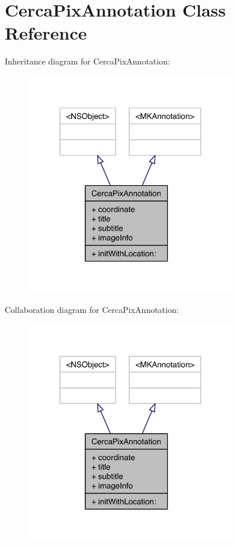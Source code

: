 \hypertarget{interface_cerca_pix_annotation}{\section{Cerca\-Pix\-Annotation Class Reference}
\label{interface_cerca_pix_annotation}
}


Inheritance diagram for Cerca\-Pix\-Annotation\-:\nopagebreak
\begin{figure}[H]
\begin{center}
\leavevmode
\includegraphics[width=258pt]{interface_cerca_pix_annotation__inherit__graph}
\end{center}
\end{figure}


Collaboration diagram for Cerca\-Pix\-Annotation\-:\nopagebreak
\begin{figure}[H]
\begin{center}
\leavevmode
\includegraphics[width=258pt]{interface_cerca_pix_annotation__coll__graph}
\end{center}
\end{figure}
